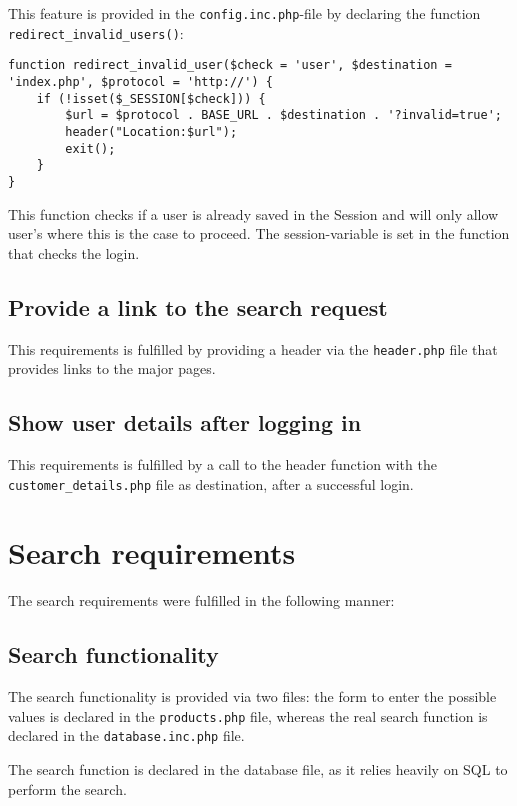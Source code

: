 This feature is provided in the \texttt{config.inc.php}-file by declaring the function \texttt{redirect\_invalid\_users()}:

\begin{lstlisting}[caption=Redirecting invalid users]
function redirect_invalid_user($check = 'user', $destination = 'index.php', $protocol = 'http://') {
	if (!isset($_SESSION[$check])) {
		$url = $protocol . BASE_URL . $destination . '?invalid=true';
		header("Location:$url");
		exit();
	}	
}

\end{lstlisting}
This function checks if a user is already saved in the Session and will only allow user's where this is the case to proceed. The session-variable is set in the function that checks the login.

\subsection{Provide a link to the search request}

This requirements is fulfilled by providing a header via the \texttt{header.php} file that provides links to the major pages.

\subsection{Show user details after logging in}

This requirements is fulfilled by a call to the header function with the \texttt{customer\_details.php} file as destination, after a successful login.

\section{Search requirements}

The search requirements were fulfilled in the following manner:

\subsection{Search functionality}

The search functionality is provided via two files: the form to enter the possible values is declared in the \texttt{products.php} file, whereas the real search function is declared in the \texttt{database.inc.php} file.

The search function is declared in the database file, as it relies heavily on SQL to perform the search.

